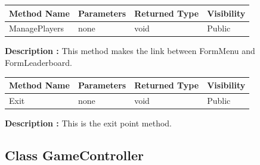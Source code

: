 \documentclass[12pt]{article}
\begin{document}
\begin{table}[H]
    \begin{tabular}{|l|l|l|l|}
    \hline
    \rowcolor[HTML]{EFEFEF} 
    \cellcolor[HTML]{EFEFEF}\textbf{Method Name} & \textbf{Parameters}    & \textbf{Returned Type} & \textbf{Visibility} \\ \hline
    ManagePlayers                                & none                   & void                   & Public              \\ \hline
    \end{tabular}
\end{table}

\textbf{Description :} This method makes the link between FormMenu and FormLeaderboard.

\begin{table}[H]
    \begin{tabular}{|l|l|l|l|}
    \hline
    \rowcolor[HTML]{EFEFEF} 
    \cellcolor[HTML]{EFEFEF}\textbf{Method Name} & \textbf{Parameters}    & \textbf{Returned Type} & \textbf{Visibility} \\ \hline
    Exit                                         & none                   & void                   & Public              \\ \hline
    \end{tabular}
\end{table}

\textbf{Description :} This is the exit point method.

\newpage


\subsection{Class GameController}
\end{document}
